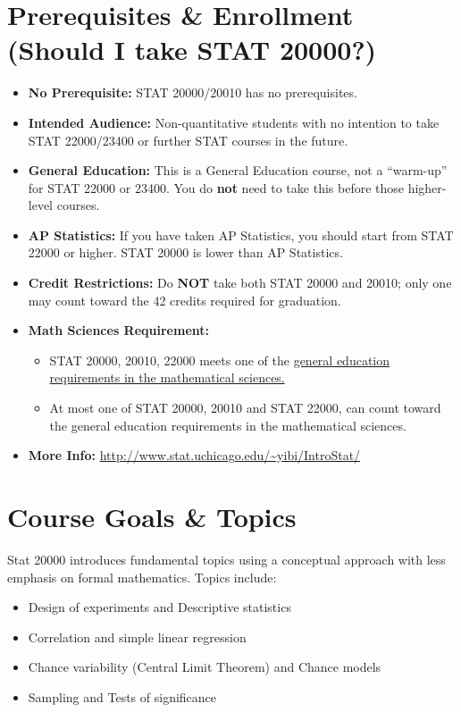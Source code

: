 \documentclass[11pt]{article}
\begin{document}
\section{Prerequisites \& Enrollment (Should I take STAT 20000?)}
\begin{itemize}[leftmargin=*, label=$\cdot$]
    \item \textbf{No Prerequisite:} STAT 20000/20010 has no prerequisites.
    \item \textbf{Intended Audience:} Non-quantitative students with no intention to take STAT 22000/23400 or further STAT courses in the future.
    \item \textbf{General Education:} This is a General Education course, not a ``warm-up'' for STAT 22000 or 23400. You do \textbf{not} need to take this before those higher-level courses.
    \item \textbf{AP Statistics:} If you have taken AP Statistics, you should start from STAT 22000 or higher. STAT 20000 is lower than AP Statistics.
    \item \textbf{Credit Restrictions:} Do \textbf{NOT} take both STAT 20000 and 20010; only one may count toward the 42 credits required for graduation.
    \item \textbf{Math Sciences Requirement:}
    \begin{itemize}
        \item STAT 20000, 20010, 22000 meets one of the \href{http://collegecatalog.uchicago.edu/thecollege/mathematicalsciencescore/}{general education requirements in the mathematical sciences.}
        \item At most one of STAT 20000, 20010 and STAT 22000, can count toward the general education requirements in the mathematical sciences.
    \end{itemize}
    \item \textbf{More Info:} \url{http://www.stat.uchicago.edu/~yibi/IntroStat/}
\end{itemize}

\section{Course Goals \& Topics}
Stat 20000 introduces fundamental topics using a conceptual approach with less emphasis on formal mathematics. Topics include:
\begin{itemize}[nosep, label=$\circ$]
    \item Design of experiments and Descriptive statistics
    \item Correlation and simple linear regression
    \item Chance variability (Central Limit Theorem) and Chance models
    \item Sampling and Tests of significance
\end{itemize}
\end{document}
